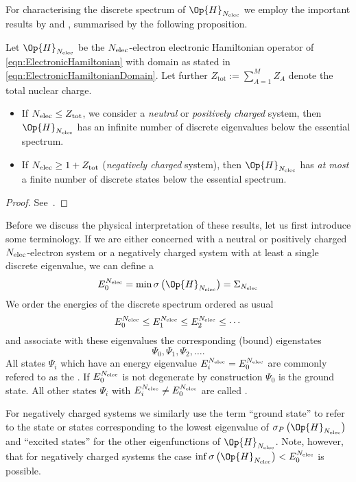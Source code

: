 For characterising the discrete spectrum of $\Op{H}_{\Nelec}$
we employ the important results by \citet{Zhislin1961} and \citet{Yafaev1976},
summarised by the following proposition.
\begin{prop}
	\label{prop:ZhislinYafaev}
	Let $\Op{H}_{\Nelec}$ be the $N_\text{elec}$-electron electronic Hamiltonian
	operator of \eqref{eqn:ElectronicHamiltonian}
	with domain as stated in \eqref{eqn:ElectronicHamiltonianDomain}.
	Let further $Z_\text{tot} := \sum_{A=1}^M Z_A$ denote the total nuclear charge.
	\begin{itemize}
		\item If $N_\text{elec} \leq Z_\text{tot}$, \ie we consider a \emph{neutral}
			or \emph{positively charged} system, then
			$\Op{H}_{\Nelec}$
			has an infinite number of discrete eigenvalues
			below the essential spectrum.
		\item If $N_\text{elec} \geq 1 + Z_\text{tot}$ (\emph{negatively charged} system),
			then $\Op{H}_{\Nelec}$ has \emph{at most} a finite number of discrete
			states below the essential spectrum.
	\end{itemize}
	\begin{proof}
		See~\cite{Zhislin1961,Yafaev1976}.
	\end{proof}
\end{prop}
Before we discuss the physical interpretation of these results,
let us first introduce some terminology.
If we are either concerned with a neutral or positively charged
$N_\text{elec}$-electron system or a negatively charged system
with at least a single discrete eigenvalue, we can define a 
\begin{equation}
	E^{\Nelec}_0 = \min \sigma\left(\Op{H}_{\Nelec}\right) = \Sigma_{\Nelec}
	\label{eqn:GroundStateEnergy}
\end{equation}
We order the energies of the discrete spectrum ordered as usual
\[ E^{N_\text{elec}}_0 \leq E^{N_\text{elec}}_1 \leq E^{N_\text{elec}}_2 \leq \cdots \]
and associate with these eigenvalues
the corresponding (bound) eigenstates
\[ \Psi_0, \Psi_1, \Psi_2, \ldots. \]
All states $\Psi_i$ which have an energy eigenvalue $E^{N_\text{elec}}_i = E^{N_\text{elec}}_0$
are commonly refered to as the .
If $E^{N_\text{elec}}_0$ is not degenerate by construction
$\Psi_0$ is the ground state.
All other states $\Psi_i$ with $E^{N_\text{elec}}_i \neq E^{N_\text{elec}}_0$
are called .

For negatively charged systems we similarly use the
term ``ground state'' to refer to the state or states corresponding
to the lowest eigenvalue of $\sigma_P\left(\Op{H}_{\Nelec}\right)$
and ``excited states'' for the other eigenfunctions of $\Op{H}_{\Nelec}$.
Note, however, that for negatively charged systems
the case \mbox{$\inf \sigma\left(\Op{H}_{\Nelec}\right) < E^{\Nelec}_0$} is possible.

